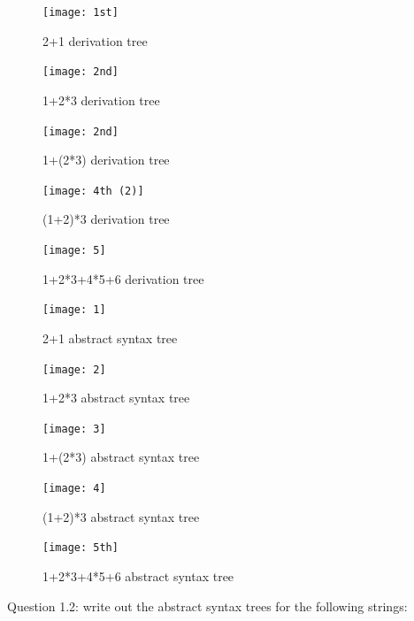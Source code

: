 \documentclass{article}
\theoremstyle{theorem}
\theoremstyle{definition}
\theoremstyle{remark}
\begin{document}
\begin{enumerate}
    \begin{figure}[htp]
    \centering
    \texttt{[image: 1st]}
    \caption{ 2+1  derivation tree}
    \label{fig: 2+1}
\end{figure}
 \begin{figure}[htp]
    \centering
    \texttt{[image: 2nd]}
    \caption{1+2*3  derivation tree}
    \label{fig:1+2*3}
\end{figure}
 \begin{figure}[htp]
    \centering
    \texttt{[image: 2nd]}
    \caption{1+(2*3)  derivation tree}
    \label{fig:1+(2*3)}
\end{figure}
 \begin{figure}[htp]
    \centering
    \texttt{[image: 4th (2)]}
    \caption{(1+2)*3  derivation tree}
    \label{fig:(1+2)*3}
\end{figure}
 \begin{figure}[htp]
    \centering
    \texttt{[image: 5]}
    \caption{1+2*3+4*5+6  derivation tree}
    \label{fig:1+2*3+4*5+6}
\end{figure}

 \begin{figure}[htp]
    \centering
    \texttt{[image: 1]}
    \caption{ 2+1  abstract syntax tree}
    \label{fig: 2+1}
\end{figure}
 \begin{figure}[htp]
    \centering
    \texttt{[image: 2]}
    \caption{1+2*3  abstract syntax tree}
    \label{fig:1+2*3}
\end{figure}
 \begin{figure}[htp]
    \centering
    \texttt{[image: 3]}
    \caption{1+(2*3)  abstract syntax tree}
    \label{fig:1+(2*3)}
\end{figure}
 \begin{figure}[htp]
    \centering
    \texttt{[image: 4]}
    \caption{(1+2)*3 abstract syntax tree}
    \label{fig:(1+2)*3}
\end{figure}
 \begin{figure}[htp]
    \centering
    \texttt{[image: 5th]}
    \caption{1+2*3+4*5+6  abstract syntax tree}
    \label{fig:1+2*3+4*5+6}
\end{figure}
\end{enumerate}

Question 1.2:
    write out the abstract syntax trees for the following strings:
\end{document}
